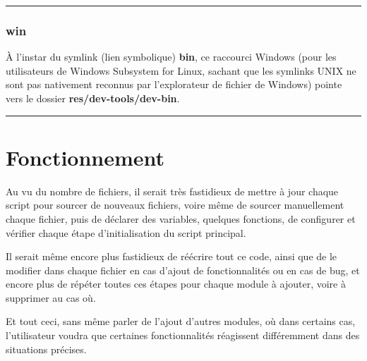 \documentclass[a4paper,10pt]{article}
\begin{document}

\color{blue}\par\noindent\rule{\textwidth}{0.4pt}\color{white}

\color{blue}
\subsubsection{win}\color{white}

\begin{justify}
    À l'instar du symlink (lien symbolique) \textbf{\color{blue}bin}, ce raccourci Windows (pour les utilisateurs de Windows Subsystem for Linux, sachant que les symlinks UNIX ne sont pas nativement reconnus par l'explorateur de fichier de Windows) pointe vers le dossier \textbf{\color{lime}res/dev-tools/dev-bin}.
\end{justify}





\color{red}\par\noindent\rule{\textwidth}{0.4pt}\color{white}

\color{red}
\section{Fonctionnement}\color{white}

\begin{justify}
    Au vu du nombre de fichiers, il serait très fastidieux de mettre à jour chaque script pour sourcer de nouveaux fichiers, voire même de sourcer manuellement chaque fichier, puis de déclarer des variables, quelques fonctions, de configurer et vérifier chaque étape d'initialisation du script principal.
\end{justify}

\begin{justify}
    Il serait même encore plus fastidieux de réécrire tout ce code, ainsi que de le modifier dans chaque fichier en cas d'ajout de fonctionnalités ou en cas de bug, et encore plus de répéter toutes ces étapes pour chaque module à ajouter, voire à supprimer au cas où.
\end{justify}

\begin{justify}
    Et tout ceci, sans même parler de l'ajout d'autres modules, où dans certains cas, l'utilisateur voudra que certaines fonctionnalités réagissent différemment dans des situations précises.
\end{justify}
\end{document}
